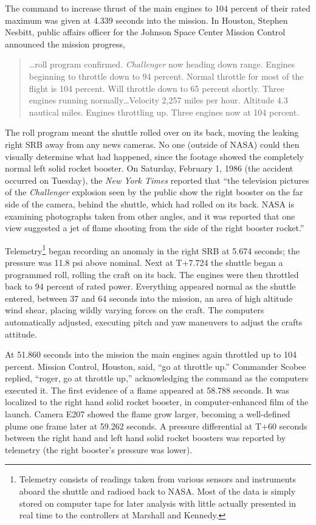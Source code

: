 The command to increase thrust of the main engines to 104 percent of their rated maximum was given at 4.339 seconds into the mission. In Houston, Stephen Nesbitt, public affairs officer for the Johnson Space Center Mission Control announced the mission progress,

\begin{singlespace}
\begin{quotation}
\noindent
\ldots roll program confirmed. {\em Challenger} now heading down range. Engines beginning to throttle down to 94 percent. Normal throttle for most of the flight is 104 percent. Will throttle down to 65 percent shortly. Three engines running normally\ldots Velocity 2,257 miles per hour. Altitude 4.3 nautical miles. Engines throttling up. Three engines now at 104 percent.
\end{quotation}
\end{singlespace}

The roll program meant the shuttle rolled over on its back, moving the leaking right SRB away from any news cameras. No one (outside of NASA) could then visually determine what had happened, since the footage showed the completely normal left solid rocket booster. On Saturday, February 1, 1986 (the accident occurred on Tuesday), the {\em New York Times} reported that ``the television pictures of the {\em Challenger} explosion seen by the public show the right booster on the far side of the camera, behind the shuttle, which had rolled on its back. NASA is examining photographs taken from other angles, and it was reported that one view suggested a jet of flame shooting from the side of the right booster rocket.''

Telemetry\footnote{Telemetry consists of readings taken from various sensors and instruments aboard the shuttle and radioed back to NASA. Most of the data is simply stored on computer tape for later analysis with little actually presented in real time to the controllers at Marshall and Kennedy.} began recording an anomaly in the right SRB at 5.674 seconds; the pressure was 11.8 psi above nominal. Next at T+7.724 the shuttle began a programmed roll, rolling the craft on its back. The engines were then throttled back to 94 percent of rated power. Everything appeared normal as the shuttle entered, between 37 and 64 seconds into the mission, an area of high altitude wind shear, placing wildly varying forces on the craft. The computers automatically adjusted, executing pitch and yaw maneuvers to adjust the crafts attitude.

At 51.860 seconds into the mission the main engines again throttled up to 104 percent. Mission Control, Houston, said, ``go at throttle up.'' Commander Scobee replied, ``roger, go at throttle up,'' acknowledging the command as the computers executed it. The first evidence of a flame appeared at 58.788 seconds. It was localized to the right hand solid rocket booster, in computer-enhanced film of the launch. Camera E207 showed the flame grow larger, becoming a well-defined plume one frame later at 59.262 seconds. A pressure differential at T+60 seconds between the right hand and left hand solid rocket boosters was reported by telemetry (the right booster's pressure was lower).

